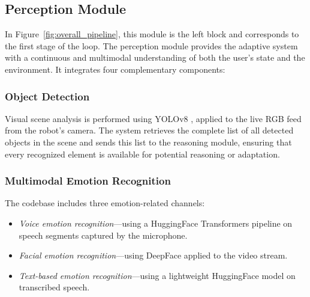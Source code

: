 \documentclass[pdflatex,sn-basic,Numbered,iicol,twocolumn]{sn-jnl}%
\begin{document}
\subsection{Perception Module}

In Figure~\ref{fig:overall_pipeline}, this module is the left block and corresponds to the first stage of the loop. The perception module provides the adaptive system with a continuous and multimodal understanding of both the user's state and the environment. It integrates four complementary components:

\subsubsection{Object Detection}
Visual scene analysis is performed using YOLOv8 \cite{YOLOv8}, applied to the live RGB feed from the robot's camera. The system retrieves the complete list of all detected objects in the scene and sends this list to the reasoning module, ensuring that every recognized element is available for potential reasoning or adaptation.

\subsubsection{Multimodal Emotion Recognition}
The codebase includes three emotion-related channels:
\begin{itemize}
\item \textit{Voice emotion recognition}—using a HuggingFace Transformers pipeline \cite{Wolf2019} on speech segments captured by the microphone.
\item \textit{Facial emotion recognition}—using DeepFace \cite{Serengil2016} applied to the video stream.
\item \textit{Text-based emotion recognition}—using a lightweight HuggingFace model \cite{Wolf2019} on transcribed speech.
\end{itemize}
\end{document}
